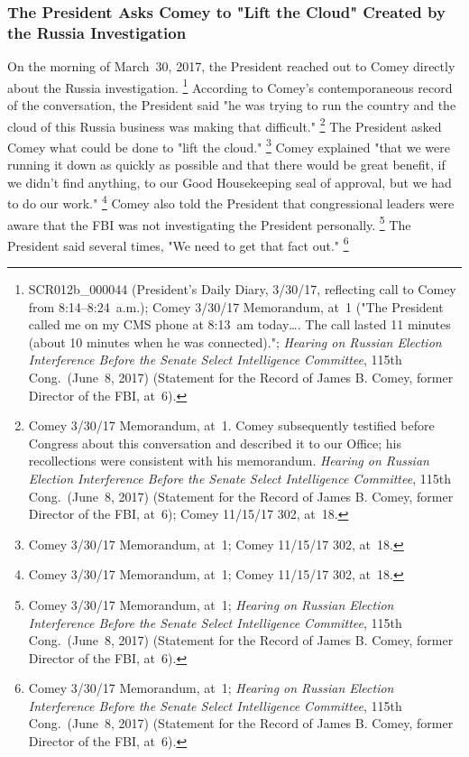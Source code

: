 \subsubsection{The President Asks Comey to "Lift the Cloud" Created by the Russia Investigation}

On the morning of March~30, 2017, the President reached out to Comey directly about the Russia investigation.%
\footnote{SCR012b\_000044 (President's Daily Diary, 3/30/17, reflecting call to Comey from 8:14--8:24~a.m.);
Comey 3/30/17 Memorandum, at~1 ("The President called me on my CMS phone at 8:13~am today\dots.
The call lasted 11 minutes (about 10 minutes when he was connected).";
\textit{Hearing on Russian Election Interference Before the Senate Select Intelligence Committee}, 115th Cong.\ (June~8, 2017) (Statement for the Record of James B. Comey, former Director of the FBI, at~6).}
According to Comey's contemporaneous record of the conversation, the President said "he was trying to run the country and the cloud of this Russia business was making that difficult."%
\footnote{Comey 3/30/17 Memorandum, at~1.
Comey subsequently testified before Congress about this conversation and described it to our Office;
his recollections were consistent with his memorandum.
\textit{Hearing on Russian Election Interference Before the Senate Select Intelligence Committee}, 115th Cong.\ (June~8, 2017) (Statement for the Record of James B. Comey, former Director of the FBI, at~6);
Comey 11/15/17 302, at~18.}
The President asked Comey what could be done to "lift the cloud."%
\footnote{Comey 3/30/17 Memorandum, at~1;
Comey 11/15/17 302, at~18.}
Comey explained "that we were running it down as quickly as possible and that there would be great benefit, if we didn't find anything, to our Good Housekeeping seal of approval, but we had to do our work."%
\footnote{Comey 3/30/17 Memorandum, at~1;
Comey 11/15/17 302, at~18.}
Comey also told the President that congressional leaders were aware that the FBI was not investigating the President personally.%
\footnote{Comey 3/30/17 Memorandum, at~1;
\textit{Hearing on Russian Election Interference Before the Senate Select Intelligence Committee}, 115th Cong.\ (June~8, 2017) (Statement for the Record of James B. Comey, former Director of the FBI, at~6).}
The President said several times, "We need to get that fact out."%
\footnote{Comey 3/30/17 Memorandum, at~1;
\textit{Hearing on Russian Election Interference Before the Senate Select Intelligence Committee}, 115th Cong.\ (June~8, 2017) (Statement for the Record of James B. Comey, former Director of the FBI, at~6).}
